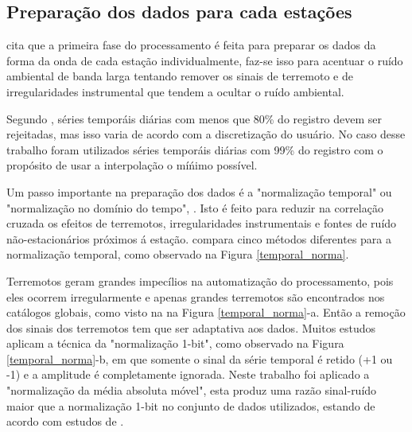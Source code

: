\subsection{Preparação dos dados para cada estações}

\cite{bensen_processing_2007} cita que a primeira fase do processamento  é feita para preparar os dados da forma da onda de cada estação individualmente, faz-se isso para acentuar o ruído ambiental de banda larga tentando remover os sinais de terremoto e de irregularidades instrumental que tendem a ocultar o ruído ambiental.

Segundo \cite{bensen_processing_2007}, séries temporáis diárias com menos que 80\% do registro devem ser rejeitadas, mas isso varia de acordo com a discretização do usuário. No caso desse trabalho foram utilizados séries  temporáis diárias com 99\% do registro com o propósito de usar a interpolação o míńimo possível.

Um passo importante na preparação dos dados é a "normalização temporal" ou "normalização no domínio do tempo", \cite{bensen_processing_2007}. Isto é feito para reduzir na correlação cruzada os efeitos de terremotos, irregularidades instrumentais e fontes de ruído não-estacionários próximos á estação. \cite{bensen_processing_2007} compara cinco métodos diferentes para a normalização temporal, como observado na Figura \ref{temporal_norma}.

Terremotos geram grandes impecílios na automatização do processamento, pois eles ocorrem irregularmente e apenas grandes terremotos são encontrados nos catálogos globais, como visto na na Figura \ref{temporal_norma}-a. Então a remoção dos sinais dos terremotos tem que ser adaptativa aos dados. Muitos estudos aplicam a técnica da "normalização 1-bit", como observado na Figura \ref{temporal_norma}-b, em que somente o sinal da série temporal é retido (+1 ou -1) e a amplitude é completamente ignorada. Neste trabalho foi aplicado a "normalização da média absoluta móvel", esta produz uma razão sinal-ruído maior que a normalização 1-bit no conjunto de dados utilizados, estando de acordo com estudos de \cite{seats_improved_2012}.

